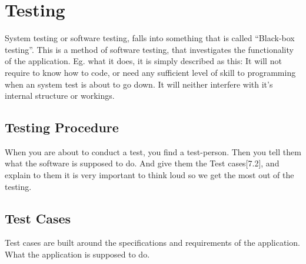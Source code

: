 
\section{Testing}
\thispagestyle{plain}
System testing or software testing, falls into something that is called “Black-box testing”. This is a method of software testing, that investigates the functionality of the application. Eg. what it does, it is simply described as this:
It will not require to know how to code, or need any sufficient level of skill to programming when an system test is about to go down. It will neither interfere with it’s internal structure or workings. 

\subsection{Testing Procedure}

When you are about to conduct a test, you find a test-person. Then you tell them what the software is supposed to do. And give them the Test cases[7.2], and explain to them it is very important to think loud so we get the most out of the testing. 

\subsection{Test Cases}

Test cases are built around the specifications and requirements of the application. What the application is supposed to do.  

